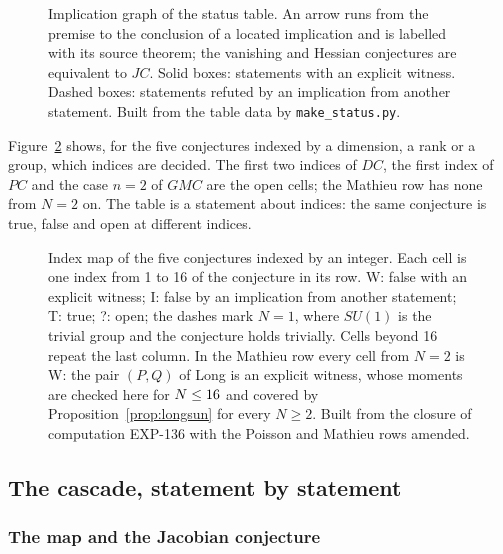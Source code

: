 \documentclass[11pt]{article}
\theoremstyle{remark}
\newcommand{\EXP}[1]{\mbox{EXP-#1}}
\begin{document}


\begin{figure}[t]
\centering

\caption{Implication graph of the status table. An arrow runs from the premise to the conclusion of a located implication and is labelled with its source theorem; the vanishing and Hessian conjectures are equivalent to $JC$. Solid boxes: statements with an explicit witness. Dashed boxes: statements refuted by an implication from another statement. Built from the table data by \texttt{make\_status.py}.}
\label{fig:graph}
\end{figure}

Figure~\ref{fig:index} shows, for the five conjectures indexed by a dimension, a rank or a group, which indices are decided. The first two indices of $DC$, the first index of $PC$ and the case $n=2$ of $GMC$ are the open cells; the Mathieu row has none from $N=2$ on. The table is a statement about indices: the same conjecture is true, false and open at different indices.

\begin{figure}[t]
\centering

\caption{Index map of the five conjectures indexed by an integer. Each cell is one index from 1 to 16 of the conjecture in its row. W: false with an explicit witness; I: false by an implication from another statement; T: true; ?: open; the dashes mark $N=1$, where $SU(1)$ is the trivial group and the conjecture holds trivially. Cells beyond 16 repeat the last column. In the Mathieu row every cell from $N=2$ is W: the pair $(P,Q)$ of Long is an explicit witness, whose moments are checked here for $N\le16$ and covered by Proposition~\ref{prop:longsun} for every $N\ge2$. Built from the closure of computation \EXP{136} with the Poisson and Mathieu rows amended.}
\label{fig:index}
\end{figure}

\subsection{The cascade, statement by statement}\label{sec:cascade}

\subsubsection*{The map and the Jacobian conjecture}\label{sec:witnessmap}
\end{document}
